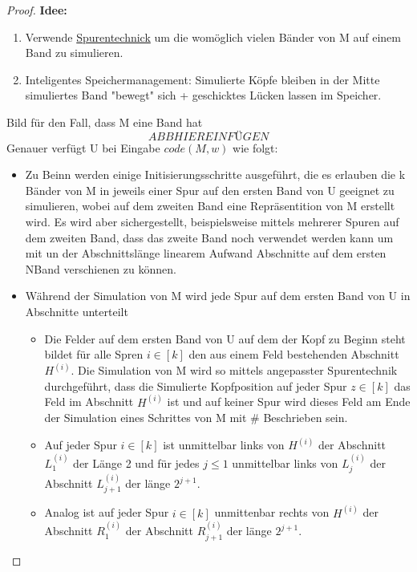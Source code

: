     \begin{proof}
        \textbf{Idee: }
            \begin{enumerate}
                \item Verwende \hyperref[subsec:2.18]{Spurentechnick} um die womöglich vielen Bänder von M auf einem Band zu simulieren.
                \item Inteligentes Speichermanagement: Simulierte Köpfe bleiben in der Mitte simuliertes Band "bewegt" sich + geschicktes Lücken lassen im Speicher.
            \end{enumerate}
            Bild für den Fall, dass M eine Band hat
            \[ABBHIEREINFÜGEN\]
            Genauer verfügt U bei Eingabe \(code(M,w)\) wie folgt:
            \begin{itemize}
                \item Zu Beinn werden einige Initisierungsschritte ausgeführt, die es erlauben die k Bänder von M in jeweils einer Spur auf den ersten Band von U geeignet zu simulieren, wobei auf dem zweiten Band eine Repräsentition von M erstellt wird. Es wird aber sichergestellt, beispielsweise mittels mehrerer Spuren auf dem zweiten Band, dass das zweite Band noch verwendet werden kann um mit un der Abschnittslänge linearem Aufwand Abschnitte auf dem ersten NBand verschienen zu können.
                \item Während der Simulation von M wird jede Spur auf dem ersten Band von U in Abschnitte unterteilt 
                \begin{itemize}
                    \item Die Felder auf dem ersten Band von U auf dem der Kopf zu Beginn steht bildet für alle Spren \(i \in [k]\) den aus einem Feld bestehenden Abschnitt \(H^{(i)}\). Die Simulation von M wird so mittels angepasster Spurentechnik durchgeführt, dass die Simulierte Kopfposition auf jeder Spur \(z \in [k]\) das Feld im Abschnitt \(H^{(i)}\) ist und auf keiner Spur wird dieses Feld am Ende der Simulation eines Schrittes von M mit \# Beschrieben sein.
                    \item Auf jeder Spur \(i \in [k]\) ist unmittelbar links von \(H^{(i)}\) der Abschnitt \(L_1^{(i)}\) der Länge 2 und für jedes \(j \leq 1\) unmittelbar links von \(L_j^{(i)}\) der Abschnitt \(L_{j+1}^{(i)}\) der länge \(2^{j+1}\). 
                    \item Analog ist auf jeder Spur \(i \in [k]\) unmittenbar rechts von \(H^{(i)}\) der Abschnitt \(R_1^{(i)}\) der Abschnitt \(R_{j+1}^{(i)}\) der länge \(2^{j+1}\).

\end{itemize}
\end{itemize}
\end{proof}
